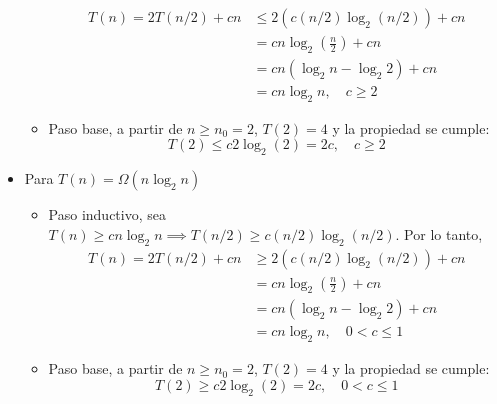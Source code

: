 \begin{problema}
\begin{itemize}
\begin{itemize}
\begin{align*}
                T(n)= 2 T(n / 2)+cn &\leq 2\left(c\left(n/2\right)\log_2 \left(n/2\right)\right)+cn \\
                &= cn\log_2\left(\frac{n}{2}\right)+cn \\
                &= cn(\log_2 n - \log_2 2)+cn\\
                &= cn\log_2n,\quad c\geq 2
            \end{align*}
            \item Paso base, a partir de $n\geq n_0=2$, $T(2)=4$ y la propiedad se cumple: 
            $$T(2)\leq c2\log_2(2)=2c,\quad c\geq 2$$ 
        \end{itemize}
        \item Para $T(n)=\Omega(n\log_2 n)$
        \begin{itemize}
            \item Paso inductivo, sea $T(n)\geq cn\log_2 n \implies T(n/2)\geq c\left(n/2\right)\log_2 (n/2)$. Por lo tanto, 
            \begin{align*}
                T(n)= 2 T(n / 2)+cn &\geq 2\left(c\left(n/2\right)\log_2 \left(n/2\right)\right)+cn \\
                &= cn\log_2\left(\frac{n}{2}\right)+cn \\
                &= cn(\log_2 n - \log_2 2)+cn\\
                &= cn\log_2n,\quad 0<c\leq 1
            \end{align*}
            \item Paso base, a partir de $n\geq n_0=2$, $T(2)=4$ y la propiedad se cumple: 
            $$T(2)\geq c2\log_2(2)=2c,\quad 0< c\leq 1$$ 
        \end{itemize}
    \end{itemize}
\end{problema}


%
%


